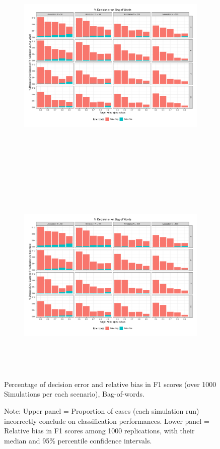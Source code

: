\documentclass[man, floatsintext, 12pt, a4paper, noextraspace]{apa6}
\begin{document}
\begin{figure}[!htbp] 
    \centering
    \begin{subfigure}[t]{0.95\textwidth}
        \centering
        \includegraphics[clip, width=\linewidth, height=11cm, page = 1]{Results/BoW_summary_05.pdf} 
    \end{subfigure}
    \begin{subfigure}[t]{0.95\textwidth}
        \centering
        \includegraphics[clip, width=\linewidth, height=10cm, page = 2]{Results/BoW_summary_05.pdf} 
    \end{subfigure}
    
    \captionsetup{format=hang}
    \caption{Percentage of decision error and relative bias in F1 scores (over 1000 Simulations per each scenario), Bag-of-words.} 
    \label{fig:Figure4}
    \captionsetup{font=small}
    \caption*{Note: Upper panel = Proportion of cases (each simulation run) incorrectly conclude on classification performances. Lower panel = Relative bias in F1 scores among 1000 replications, with their median and 95\% percentile confidence intervals.}
\end{figure}     
\end{document}
